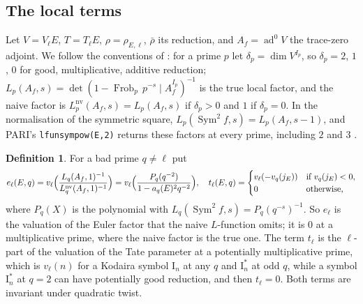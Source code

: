 \documentclass[11pt]{amsart}
\theoremstyle{definition}
\newtheorem{definition}[theorem]{Definition}
\newcommand{\ad}{\operatorname{ad}^0}
\newcommand{\Sym}{\operatorname{Sym}^2}
\newcommand{\nv}{\mathrm{nv}}
\newcommand{\Frob}{\operatorname{Frob}}
\begin{document}
\subsection{The local terms}
Let $V=V_\ell E$, $T=T_\ell E$, $\rho=\rho_{E,\ell}$, $\bar\rho$ its reduction, and $A_f=\ad V$ the trace-zero adjoint. We follow the conventions of \cite[\S1.7.2]{DFG04}: for a prime $p$ let $\delta_p=\dim V^{I_p}$, so $\delta_p=2$, $1$, $0$ for good, multiplicative, additive reduction; $L_p(A_f,s)=\det(1-\Frob_p\,p^{-s}\mid A_f^{I_p})^{-1}$ is the true local factor, and the naive factor is $L_p^{\nv}(A_f,s)=L_p(A_f,s)$ if $\delta_p>0$ and $1$ if $\delta_p=0$. In the normalisation of the symmetric square, $L_p(\Sym f,s)=L_p(A_f,s-1)$, and PARI's \texttt{lfunsympow(E,2)} returns these factors at every prime, including $2$ and $3$ \cite{PARI}.

\begin{definition}\label{def:terms}
For a bad prime $q\ne\ell$ put
\[
e_\ell(E,q)=v_\ell\Bigl(\frac{L_q(A_f,1)^{-1}}{L_q^{\nv}(A_f,1)^{-1}}\Bigr)=v_\ell\Bigl(\frac{P_q(q^{-2})}{1-a_q(E)^2q^{-2}}\Bigr),\quad
t_\ell(E,q)=\begin{cases}v_\ell(-v_q(j_E))&\text{if }v_q(j_E)<0,\\0&\text{otherwise,}\end{cases}
\]
where $P_q(X)$ is the polynomial with $L_q(\Sym f,s)=P_q(q^{-s})^{-1}$. So $e_\ell$ is the valuation of the Euler factor that the naive $L$-function omits; it is $0$ at a multiplicative prime, where the naive factor is the true one. The term $t_\ell$ is the $\ell$-part of the valuation of the Tate parameter at a potentially multiplicative prime, which is $v_\ell(n)$ for a Kodaira symbol $\mathrm{I}_n$ at any $q$ and $\mathrm{I}_n^*$ at odd $q$, while a symbol $\mathrm{I}_n^*$ at $q=2$ can have potentially good reduction, and then $t_\ell=0$. Both terms are invariant under quadratic twist.
\end{definition}
\end{document}
